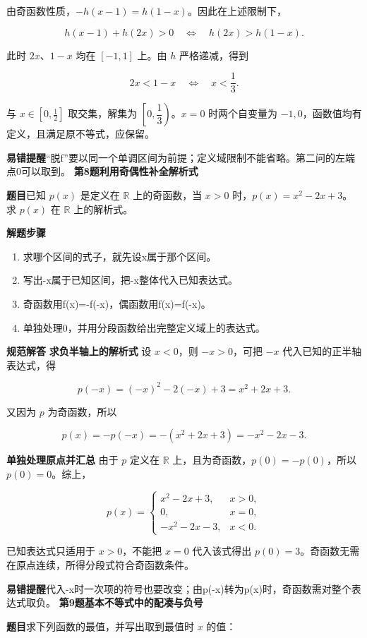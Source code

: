 \documentclass[UTF8,zihao=-4]{ctexart}
\newcommand{\labeltext}[1]{\par\textbf{#1}\quad}
\begin{document}
由奇函数性质，$-h(x-1)=h(1-x)$。因此在上述限制下，\par
\[h(x-1)+h(2x)>0\quad\Longleftrightarrow\quad h(2x)>h(1-x).\]\par
此时 $2x$、$1-x$ 均在 $[-1,1]$ 上。由 $h$ 严格递减，得到\par
\[2x<1-x\quad\Longleftrightarrow\quad x<\frac13.\]\par
与 $x\in[0,\tfrac12]$ 取交集，解集为 $\boxed{\left[0,\dfrac13\right)}$。$x=0$ 时两个自变量为 $-1,0$，函数值均有定义，且满足原不等式，应保留。\par
\labeltext{易错提醒}“脱f”要以同一个单调区间为前提；定义域限制不能省略。第二问的左端点0可以取到。
\clearpage
{\Large\bfseries 第8题\quad 利用奇偶性补全解析式}
\labeltext{题目}已知 $p(x)$ 是定义在 $\mathbb R$ 上的奇函数，当 $x>0$ 时，$p(x)=x^2-2x+3$。求 $p(x)$ 在 $\mathbb R$ 上的解析式。
\labeltext{解题步骤}\begin{enumerate}
\item 求哪个区间的式子，就先设x属于那个区间。
\item 写出-x属于已知区间，把-x整体代入已知表达式。
\item 奇函数用f(x)=-f(-x)，偶函数用f(x)=f(-x)。
\item 单独处理0，并用分段函数给出完整定义域上的表达式。
\end{enumerate}
\labeltext{规范解答}
\textbf{求负半轴上的解析式}\quad
设 $x<0$，则 $-x>0$，可把 $-x$ 代入已知的正半轴表达式，得\par
\[p(-x)=(-x)^2-2(-x)+3=x^2+2x+3.\]\par
又因为 $p$ 为奇函数，所以\par
\[p(x)=-p(-x)=-(x^2+2x+3)=-x^2-2x-3.\]\par
\par{}
\textbf{单独处理原点并汇总}\quad
由于 $p$ 定义在 $\mathbb R$ 上，且为奇函数，$p(0)=-p(0)$，所以 $p(0)=0$。综上，\par
\[\boxed{p(x)=\begin{cases}x^2-2x+3,&x>0,\\0,&x=0,\\-x^2-2x-3,&x<0.\end{cases}}\]\par
已知表达式只适用于 $x>0$，不能把 $x=0$ 代入该式得出 $p(0)=3$。奇函数无需在原点连续，所得分段式符合奇函数条件。\par
\labeltext{易错提醒}代入-x时一次项的符号也要改变；由p(-x)转为p(x)时，奇函数需对整个表达式取负。
\clearpage
{\Large\bfseries 第9题\quad 基本不等式中的配凑与负号}
\labeltext{题目}求下列函数的最值，并写出取到最值时 $x$ 的值：
\end{document}
